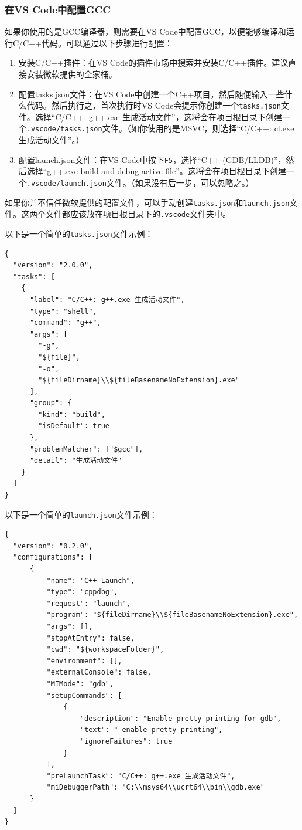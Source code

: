 \documentclass[../main.tex]{subfiles}
\begin{document}
\subsubsection{在VS Code中配置GCC}

如果你使用的是GCC编译器，则需要在VS Code中配置GCC，以便能够编译和运行C/C++代码。可以通过以下步骤进行配置：

\begin{enumerate}
  \item 安装C/C++插件：在VS Code的插件市场中搜索并安装C/C++插件。建议直接安装微软提供的全家桶。
  \item 配置tasks.json文件：在VS Code中创建一个C++项目，然后随便输入一些什么代码。然后执行之，首次执行时VS Code会提示你创建一个\texttt{tasks.json}文件。选择“C/C++: g++.exe 生成活动文件”，这将会在项目根目录下创建一个\texttt{.vscode/tasks.json}文件。（如你使用的是MSVC，则选择“C/C++: cl.exe 生成活动文件”。）
  \item 配置launch.json文件：在VS Code中按下\texttt{F5}，选择“C++ (GDB/LLDB)”，然后选择“g++.exe build and debug active file”。这将会在项目根目录下创建一个\texttt{.vscode/launch.json}文件。（如果没有后一步，可以忽略之。）
\end{enumerate}

如果你并不信任微软提供的配置文件，可以手动创建\texttt{tasks.json}和\texttt{launch.json}文件。这两个文件都应该放在项目根目录下的\texttt{.vscode}文件夹中。

以下是一个简单的\texttt{tasks.json}文件示例：

\begin{verbatim}
{
  "version": "2.0.0",
  "tasks": [
    {
      "label": "C/C++: g++.exe 生成活动文件",
      "type": "shell",
      "command": "g++",
      "args": [
        "-g",
        "${file}",
        "-o",
        "${fileDirname}\\${fileBasenameNoExtension}.exe"
      ],
      "group": {
        "kind": "build",
        "isDefault": true
      },
      "problemMatcher": ["$gcc"],
      "detail": "生成活动文件"
    }
  ]
}
\end{verbatim}

以下是一个简单的\texttt{launch.json}文件示例：

\begin{verbatim}
{
  "version": "0.2.0",
  "configurations": [
      {
          "name": "C++ Launch",
          "type": "cppdbg",
          "request": "launch",
          "program": "${fileDirname}\\${fileBasenameNoExtension}.exe",
          "args": [],
          "stopAtEntry": false,
          "cwd": "${workspaceFolder}",
          "environment": [],
          "externalConsole": false,
          "MIMode": "gdb",
          "setupCommands": [
              {
                  "description": "Enable pretty-printing for gdb",
                  "text": "-enable-pretty-printing",
                  "ignoreFailures": true
              }
          ],
          "preLaunchTask": "C/C++: g++.exe 生成活动文件",
          "miDebuggerPath": "C:\\msys64\\ucrt64\\bin\\gdb.exe"
      }
  ]
}
\end{verbatim}
\end{document}
